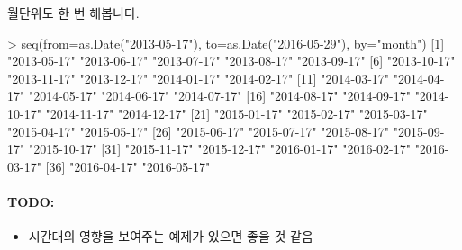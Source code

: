 \documentclass[tutorial.tex]{subfiles}
\begin{document}
월단위도 한 번 해봅니다.
\begin{Schunk}
\begin{Soutput} 
> seq(from=as.Date("2013-05-17"), to=as.Date("2016-05-29"), by="month")
 [1] "2013-05-17" "2013-06-17" "2013-07-17" "2013-08-17" "2013-09-17"
 [6] "2013-10-17" "2013-11-17" "2013-12-17" "2014-01-17" "2014-02-17"
[11] "2014-03-17" "2014-04-17" "2014-05-17" "2014-06-17" "2014-07-17"
[16] "2014-08-17" "2014-09-17" "2014-10-17" "2014-11-17" "2014-12-17"
[21] "2015-01-17" "2015-02-17" "2015-03-17" "2015-04-17" "2015-05-17"
[26] "2015-06-17" "2015-07-17" "2015-08-17" "2015-09-17" "2015-10-17"
[31] "2015-11-17" "2015-12-17" "2016-01-17" "2016-02-17" "2016-03-17"
[36] "2016-04-17" "2016-05-17"
\end{Soutput}
\end{Schunk}




\paragraph{TODO:}
\begin{itemize}
	\item 시간대의 영향을 보여주는 예제가 있으면 좋을 것 같음
\end{itemize}


\begin{comment}



\end{comment}
\end{document}
